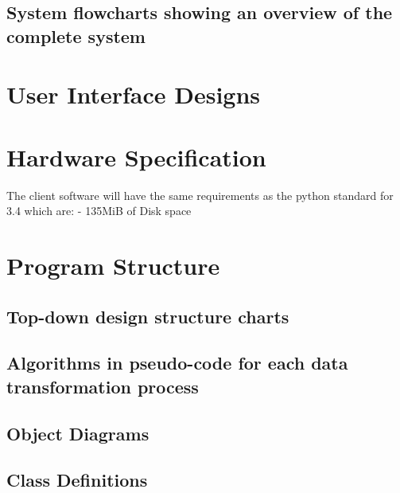 \subsection{System flowcharts showing an overview of the complete system}

\section{User Interface Designs}
	

\section{Hardware Specification}
	The client software will have the same requirements as the python standard for 3.4 which are:
	- 135MiB of Disk space


\section{Program Structure}

\subsection{Top-down design structure charts}


\subsection{Algorithms in pseudo-code for each data transformation process}


\subsection{Object Diagrams}


\subsection{Class Definitions}

	\begin{figure}[H]
		\inlcudegraphics[width=\textwidth]{}

	\end{figure}


